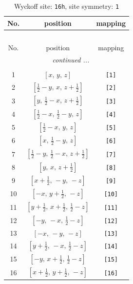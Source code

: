 \documentclass[fleqn,8pt]{jsarticle}
\begin{document}
\begin{longtable}{ccc}
\caption{Wyckoff site: {\tt 16h}, site symmetry: {\tt 1}}
 \\
 \hline \hline
No. & position & mapping \\ \hline \endfirsthead

\multicolumn{2}{l}{\tablename\ \thetable{}} \\
 \hline \hline
No. & position & mapping \\ \hline \endhead

 \hline \hline
\multicolumn{2}{r}{\footnotesize\it continued ...} \\ \endfoot

 \hline \hline
\multicolumn{2}{r}{} \\ \endlastfoot

1 & $\left[ x,\, y,\, z \right]$ & {\tt [1]} \\ \hline
2 & $\left[ \frac{1}{2} - y,\, x,\, z + \frac{1}{2} \right]$ & {\tt [2]} \\ \hline
3 & $\left[ y,\, \frac{1}{2} - x,\, z + \frac{1}{2} \right]$ & {\tt [3]} \\ \hline
4 & $\left[ \frac{1}{2} - x,\, \frac{1}{2} - y,\, z \right]$ & {\tt [4]} \\ \hline
5 & $\left[ \frac{1}{2} - x,\, y,\, z \right]$ & {\tt [5]} \\ \hline
6 & $\left[ x,\, \frac{1}{2} - y,\, z \right]$ & {\tt [6]} \\ \hline
7 & $\left[ \frac{1}{2} - y,\, \frac{1}{2} - x,\, z + \frac{1}{2} \right]$ & {\tt [7]} \\ \hline
8 & $\left[ y,\, x,\, z + \frac{1}{2} \right]$ & {\tt [8]} \\ \hline
9 & $\left[ x + \frac{1}{2},\, - y,\, - z \right]$ & {\tt [9]} \\ \hline
10 & $\left[ - x,\, y + \frac{1}{2},\, - z \right]$ & {\tt [10]} \\ \hline
11 & $\left[ y + \frac{1}{2},\, x + \frac{1}{2},\, \frac{1}{2} - z \right]$ & {\tt [11]} \\ \hline
12 & $\left[ - y,\, - x,\, \frac{1}{2} - z \right]$ & {\tt [12]} \\ \hline
13 & $\left[ - x,\, - y,\, - z \right]$ & {\tt [13]} \\ \hline
14 & $\left[ y + \frac{1}{2},\, - x,\, \frac{1}{2} - z \right]$ & {\tt [14]} \\ \hline
15 & $\left[ - y,\, x + \frac{1}{2},\, \frac{1}{2} - z \right]$ & {\tt [15]} \\ \hline
16 & $\left[ x + \frac{1}{2},\, y + \frac{1}{2},\, - z \right]$ & {\tt [16]} \\
\end{longtable}
\end{document}
